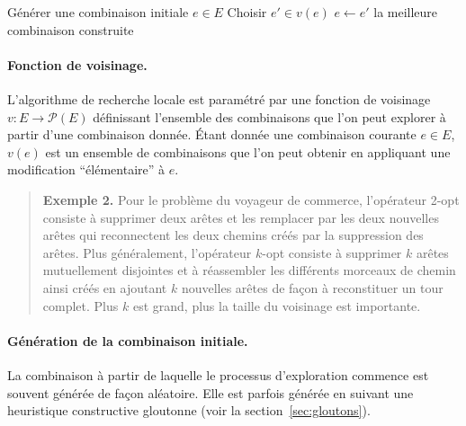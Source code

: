 \documentclass[12pt,a4paper]{book}
\begin{document}
\begin{algorithm}[ht]
\caption{Recherche locale}
\label{alg:locale}
\begin{algorithmic}[1]
\State Générer une combinaison initiale $e \in E$
  \State Choisir $e' \in v(e)$
  \State $e \leftarrow e'$
\EndWhile
\State \Return la meilleure combinaison construite
\end{algorithmic}
\end{algorithm}

\paragraph{Fonction de voisinage.}
L'algorithme de recherche locale est paramétré par une fonction de voisinage $v : E \to \mathcal{P}(E)$ définissant l'ensemble des combinaisons que l'on peut explorer à partir d'une combinaison donnée. Étant donnée une combinaison courante $e \in E$, $v(e)$ est un ensemble de combinaisons que l'on peut obtenir en appliquant une modification ``élémentaire'' à $e$.

\begin{quote}
\textbf{Exemple 2.} Pour le problème du voyageur de commerce, l'opérateur 2-opt consiste à supprimer deux arêtes et les remplacer par les deux nouvelles arêtes qui reconnectent les deux chemins créés par la suppression des arêtes. Plus généralement, l'opérateur $k$-opt consiste à supprimer $k$ arêtes mutuellement disjointes et à réassembler les différents morceaux de chemin ainsi créés en ajoutant $k$ nouvelles arêtes de façon à reconstituer un tour complet. Plus $k$ est grand, plus la taille du voisinage est importante.
\end{quote}

\paragraph{Génération de la combinaison initiale.}
La combinaison à partir de laquelle le processus d'exploration commence est souvent générée de façon aléatoire. Elle est parfois générée en suivant une heuristique constructive gloutonne (voir la section~\ref{sec:gloutons}).
\end{document}
